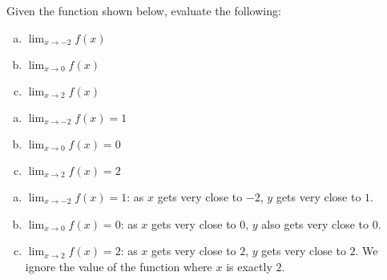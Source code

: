 %
%

\subsection*{\Conceptual}

\begin{question}
Given the function shown below, evaluate the following:
\begin{enumerate}[(a)]
\item $\displaystyle \lim_{x \rightarrow -2} f(x)$
\item $\displaystyle \lim_{x \rightarrow 0}f(x)$
\item $\displaystyle \lim_{x \rightarrow 2}f(x)$
\end{enumerate}
\begin{center}
\end{center}
\end{question}
\begin{answer}
\begin{enumerate}[(a)]
\item $\displaystyle \lim_{x \rightarrow -2} f(x)=1$
\item $\displaystyle \lim_{x \rightarrow 0}f(x)=0$
\item $\displaystyle \lim_{x \rightarrow 2}f(x)=2$
\end{enumerate}
\end{answer}
\begin{solution}
\begin{enumerate}[(a)]
\item $\displaystyle \lim_{x \rightarrow -2} f(x)=1$: as $x$ gets very close to $-2$, $y$ gets very close to $1$.
\item $\displaystyle \lim_{x \rightarrow 0}f(x)=0$: as $x$ gets very close to $0$, $y$ also gets very close to $0$.
\item $\displaystyle \lim_{x \rightarrow 2}f(x)=2$: as $x$ gets very close to $2$, $y$ gets very close to $2$. We ignore the value of the function where $x$ is exactly $2$.
\end{enumerate}
\end{solution}

